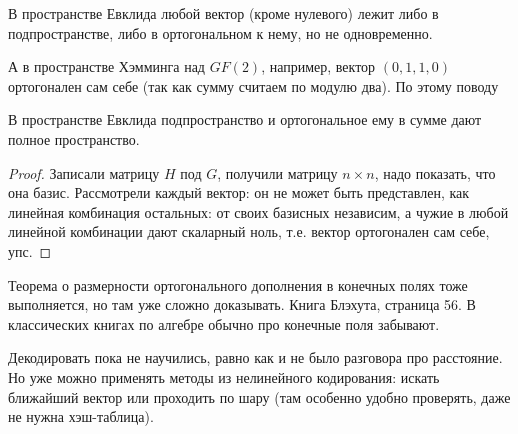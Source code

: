 \begin{Rem}
	В пространстве Евклида любой вектор (кроме нулевого)
	лежит либо в подпространстве,
	либо в ортогональном к нему, но не одновременно.

	А в пространстве Хэмминга над $GF(2)$, например, вектор $(0, 1, 1, 0)$
	ортогонален сам себе (так как сумму считаем по модулю два).
	По этому поводу \TODO
\end{Rem}
\begin{lemma}
	В пространстве Евклида подпространство и ортогональное ему в сумме
	дают полное пространство.
\end{lemma}
\begin{proof}
	Записали матрицу $H$ под $G$, получили матрицу $n\times n$,
	надо показать, что она базис.
	\TODO
	Рассмотрели каждый вектор: он не может быть представлен, как линейная
	комбинация остальных: от своих базисных независим, а чужие в любой линейной
	комбинации дают скаларный ноль, т.е. вектор ортогонален сам себе, упс.
\end{proof}
\begin{Rem}
	Теорема о размерности ортогонального дополнения в конечных
	полях тоже выполняется, но там уже сложно доказывать.
	Книга Блэхута, страница 56.
	В классических книгах по алгебре обычно про конечные поля забывают.
\end{Rem}

Декодировать пока не научились, равно как и не было разговора про расстояние.
Но уже можно применять методы из нелинейного кодирования: искать ближайший вектор
или проходить по шару (там особенно удобно проверять, даже не нужна хэш-таблица).
